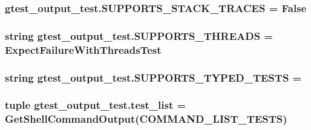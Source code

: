 \subsubsection[{S\+U\+P\+P\+O\+R\+T\+S\+\_\+\+S\+T\+A\+C\+K\+\_\+\+T\+R\+A\+C\+E\+S}]{\setlength{\rightskip}{0pt plus 5cm}gtest\+\_\+output\+\_\+test.\+S\+U\+P\+P\+O\+R\+T\+S\+\_\+\+S\+T\+A\+C\+K\+\_\+\+T\+R\+A\+C\+E\+S = False}\label{namespacegtest__output__test_a0bab477a98b8f74922a43ca21f4fca13}
\hypertarget{namespacegtest__output__test_a9c611ee196914defbb5d32a47c606640}{}
\subsubsection[{S\+U\+P\+P\+O\+R\+T\+S\+\_\+\+T\+H\+R\+E\+A\+D\+S}]{\setlength{\rightskip}{0pt plus 5cm}string gtest\+\_\+output\+\_\+test.\+S\+U\+P\+P\+O\+R\+T\+S\+\_\+\+T\+H\+R\+E\+A\+D\+S = \textquotesingle{}Expect\+Failure\+With\+Threads\+Test\textquotesingle{}}\label{namespacegtest__output__test_a9c611ee196914defbb5d32a47c606640}
\hypertarget{namespacegtest__output__test_aa762abdf62ac6efe1aa2405b3f506380}{}
\subsubsection[{S\+U\+P\+P\+O\+R\+T\+S\+\_\+\+T\+Y\+P\+E\+D\+\_\+\+T\+E\+S\+T\+S}]{\setlength{\rightskip}{0pt plus 5cm}string gtest\+\_\+output\+\_\+test.\+S\+U\+P\+P\+O\+R\+T\+S\+\_\+\+T\+Y\+P\+E\+D\+\_\+\+T\+E\+S\+T\+S = \textquotesingle{}}\label{namespacegtest__output__test_aa762abdf62ac6efe1aa2405b3f506380}
\hypertarget{namespacegtest__output__test_a2da84cfb32bbb8634f1f5853795d6051}{}
\subsubsection[{test\+\_\+list}]{\setlength{\rightskip}{0pt plus 5cm}tuple gtest\+\_\+output\+\_\+test.\+test\+\_\+list = {\bf Get\+Shell\+Command\+Output}({\bf C\+O\+M\+M\+A\+N\+D\+\_\+\+L\+I\+S\+T\+\_\+\+T\+E\+S\+T\+S})}\label{namespacegtest__output__test_a2da84cfb32bbb8634f1f5853795d6051}
